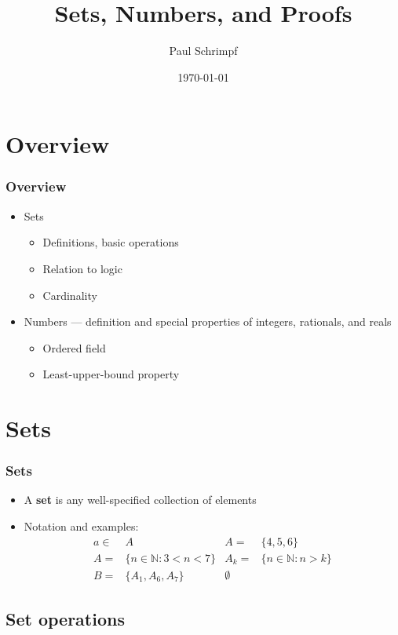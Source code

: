 \documentclass[compress]{beamer}
\title{Sets, Numbers, and Proofs}
\author{Paul Schrimpf}
\institute{UBC \\ Economics 526}
\date{\today}
\begin{document}
\frame{\titlepage}

\section{Overview}

\begin{frame}
  \frametitle{Overview}
  \begin{itemize}
  \item Sets 
    \begin{itemize}
    \item Definitions, basic operations
    \item Relation to logic
    \item Cardinality 
    \end{itemize}
  \item Numbers --- definition and special properties of integers,
    rationals, and reals
    \begin{itemize}
    \item Ordered field
    \item Least-upper-bound property
    \end{itemize}
  \end{itemize}
\end{frame}


\section{Sets \label{s:sets}} 

\begin{frame}
  \frametitle{Sets}
  \begin{itemize}
  \item A \textbf{set} is any well-specified collection of
    elements
  \item Notation and examples:
    \begin{align*} 
      a \in & A   & 
      A = & \{4 , 5, 6 \} \\
      A = & \{n \in \mathbb{N}: 3 < n < 7 \}  & 
      A_k = & \{ n \in \mathbb{N}: n > k \} \\ 
      B = & \{ A_1, A_6, A_7 \} & \emptyset 
    \end{align*}
  \end{itemize}
\end{frame}

\subsection{Set operations}
\end{document}
